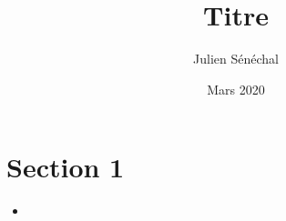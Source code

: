 \documentclass[a4paper]{article}
\title{Titre}
\author{Julien Sénéchal}
\date{Mars 2020}
\begin{document}
\maketitle















\section{Section 1}





\begin{itemize}





\item 





\end{itemize}
\end{document}
